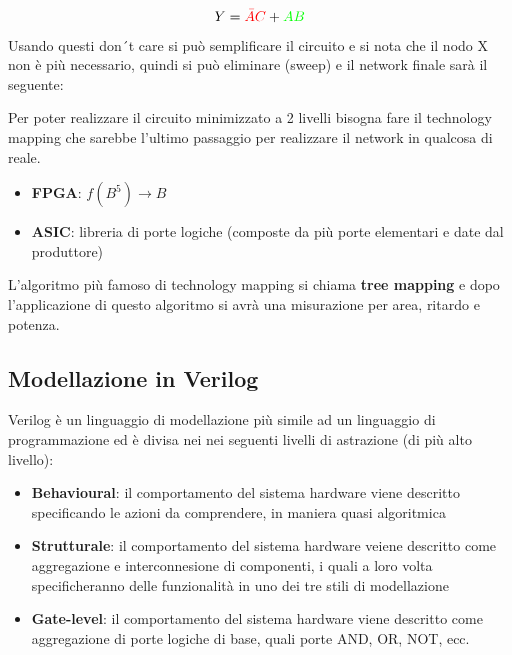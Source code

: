 \documentclass[a4paper]{article}
\theoremstyle{break}
\theoremstyle{break}
\theoremstyle{break}
\theoremstyle{break}
\begin{document}
\[
  Y = \color{red} \bar{A}C \color{black} + \color{green} AB \color{black}
\] 
Usando questi don´t care si può semplificare il circuito e si nota che il nodo X non
è più necessario, quindi si può eliminare (sweep) e il network finale sarà il seguente:
\begin{figure}[H]
  \begin{center}
  \end{center}
\end{figure}

Per poter realizzare il circuito minimizzato a 2 livelli bisogna fare il technology mapping
che sarebbe l'ultimo passaggio per realizzare il network in qualcosa di reale.
\begin{itemize}
  \item \textbf{FPGA}: \( f(B^5) \to B \) 
  \item \textbf{ASIC}: libreria di porte logiche (composte da più porte elementari e date dal produttore)
\end{itemize}
L'algoritmo più famoso di technology mapping si chiama \textbf{tree mapping} e dopo l'applicazione
di questo algoritmo si avrà una misurazione per area, ritardo e potenza.

\subsection{Modellazione in Verilog}
Verilog è un linguaggio di modellazione più simile ad un linguaggio di programmazione ed
è divisa nei nei seguenti livelli di astrazione (di più alto livello):
\begin{itemize}
  \item \textbf{Behavioural}: il comportamento del sistema hardware viene descritto
    specificando le azioni da comprendere, in maniera quasi algoritmica
  \item \textbf{Strutturale}: il comportamento del sistema hardware veiene descritto come
    aggregazione e interconnesione di componenti, i quali a loro volta
    specificheranno delle funzionalità in uno dei tre stili di modellazione
  \item \textbf{Gate-level}: il comportamento del sistema hardware viene descritto come
    aggregazione di porte logiche di base, quali porte AND, OR, NOT, ecc.
\end{itemize}
\end{document}
